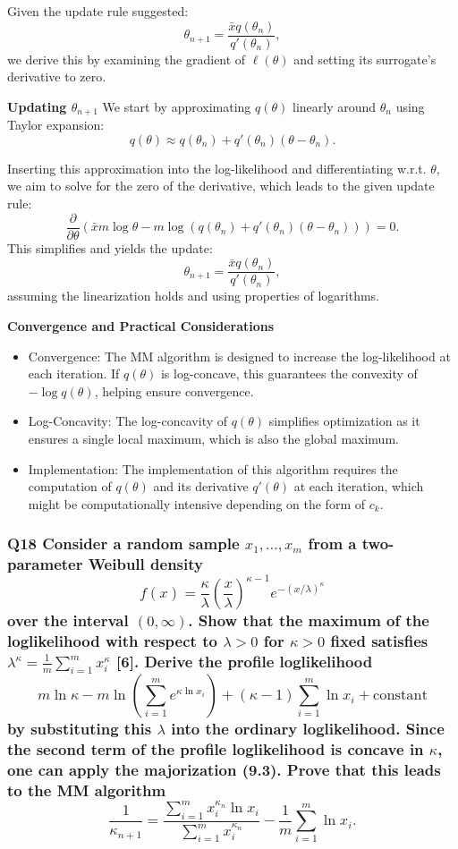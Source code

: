 \documentclass[8pt]{article}
\begin{document}
{Given the update rule suggested:
\[
\theta_{n+1} = \frac{\bar{x} q(\theta_n)}{q'(\theta_n)},
\]
we derive this by examining the gradient of \(\ell(\theta)\) and setting its surrogate's derivative to zero.

\textbf{Updating \(\theta_{n+1}\)}
We start by approximating \(q(\theta)\) linearly around \(\theta_n\) using Taylor expansion:
\[
q(\theta) \approx q(\theta_n) + q'(\theta_n)(\theta - \theta_n).
\]

Inserting this approximation into the log-likelihood and differentiating w.r.t. \(\theta\), we aim to solve for the zero of the derivative, which leads to the given update rule:
\[
\frac{\partial}{\partial \theta} \left(\bar{x} m \log \theta - m \log (q(\theta_n) + q'(\theta_n)(\theta - \theta_n))\right) = 0.
\]
This simplifies and yields the update:
\[
\theta_{n+1} = \frac{\bar{x} q(\theta_n)}{q'(\theta_n)},
\]
assuming the linearization holds and using properties of logarithms.

\textbf{Convergence and Practical Considerations}
\begin{itemize}
    \item Convergence: The MM algorithm is designed to increase the log-likelihood at each iteration. If \(q(\theta)\) is log-concave, this guarantees the convexity of \(-\log q(\theta)\), helping ensure convergence.
    \item Log-Concavity: The log-concavity of \(q(\theta)\) simplifies optimization as it ensures a single local maximum, which is also the global maximum.
    \item Implementation: The implementation of this algorithm requires the computation of \(q(\theta)\) and its derivative \(q'(\theta)\) at each iteration, which might be computationally intensive depending on the form of \(c_k\).
\end{itemize}


\subsubsection*{Q18 Consider a random sample \( x_1, \ldots, x_m \) from a two-parameter Weibull density
\[
f(x) = \frac{\kappa}{\lambda} \left( \frac{x}{\lambda} \right)^{\kappa - 1} e^{-(x / \lambda)^\kappa}
\]
over the interval \((0, \infty)\). Show that the maximum of the loglikelihood with respect to \(\lambda > 0\) for \(\kappa > 0\) fixed satisfies \(\lambda^\kappa = \frac{1}{m} \sum_{i=1}^m x_i^\kappa\) [6]. Derive the profile loglikelihood
\[
m \ln \kappa - m \ln \left( \sum_{i=1}^m e^{\kappa \ln x_i} \right) + (\kappa - 1) \sum_{i=1}^m \ln x_i + \text{constant}
\]
by substituting this \(\lambda\) into the ordinary loglikelihood. Since the second term of the profile loglikelihood is concave in \(\kappa\), one can apply the majorization (9.3). Prove that this leads to the MM algorithm
\[
\frac{1}{\kappa_{n+1}} = \frac{\sum_{i=1}^m x_i^{\kappa_n} \ln x_i}{\sum_{i=1}^m x_i^{\kappa_n}} - \frac{1}{m} \sum_{i=1}^m \ln x_i.
\]}

}
\end{document}
